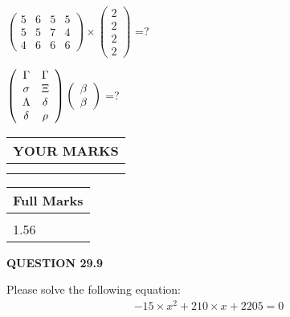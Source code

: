 \documentclass[12pt]{article}
\begin{document}
  
 
$ \left( \begin{array}{ccccccccc}
           5 & 
           6 & 
           5 & 
           5 \\ 
           5 & 
           5 & 
           7 & 
           4 \\ 
           4 & 
           6 & 
           6 & 
           6
\end{array}\right) \times
\left( \begin{array}{c}
           2 \\ 
           2 \\ 
           2 \\ 
           2
\end{array}\right) $ =?
 
 
$  %
 \left( \begin{array}
 {
 c
 c
 }
 \Gamma & 
 \Gamma \\ 
 \sigma & 
                    \Xi \\ 
 \Lambda & 
 \delta \\ 
 \delta & 
 \rho
 \end{array} \right)
 \left( \begin{array}
 {
 c
 }
 \beta \\ 
 \beta
 \end{array} \right)
$ =?
 

 

 
\vspace{0.3in}
  
\vspace{0.2in}
  
\noindent\begin{tabular}{|l|}
\hline
 YOUR MARKS  \\
\hline
 \\ 
 \\ 
\hline
\end{tabular}
\hspace{0.05in} \begin{tabular}{|l|}
\hline
 Full Marks  \\
\hline
 \\ 
1.56 \\
\hline
\end{tabular}
{\textbf{\Large{QUESTION
29.9 
}}}
  
  
 
 

 
Please solve the following equation:
\begin{eqnarray*}
-15 \times x^2  %
+  %
210
                 \times x    %
+  %
2205 =0
\end{eqnarray*}
 
\end{document}
